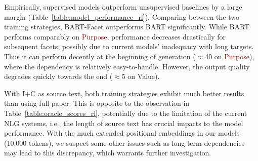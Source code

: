 \documentclass[11pt,a4paper]{article}
\newcommand{\absp}{\textcolor{darkred}{Purpose}\xspace}
\newcommand{\absv}{\textcolor{darkyellow}{Value}\xspace}
\newcommand{\bart}{BART\xspace}
\newcommand{\bartf}{BART-Facet\xspace}
\begin{document}
Empirically, supervised models outperform unsupervised baselines by a large margin (Table~\ref{table:model_performance_rl}).
Comparing between the two training strategies, \bartf  outperforms \bart significantly.
While \bart performs comparably on \absp, performance decreases drastically for subsequent facets, possibly due to current models' inadequacy with long targets.
Thus it can perform decently at the beginning of generation ($\approx$40 on \absp), where the dependency is relatively easy-to-handle. 
However, the output quality degrades quickly towards the end ($\approx$5 on \absv).

With I+C as source text, both training strategies exhibit much better results than using full paper. This is opposite to the observation in Table~\ref{table:oracle_scores_rl}, potentially due to the limitation of the current NLG systems, i.e., the length of source text has crucial impacts to the model performance.
With the much extended positional embeddings in our models (10,000 tokens), we suspect some other issues such as long term dependencies may lead to this discrepancy, which warrants further investigation.
\end{document}
